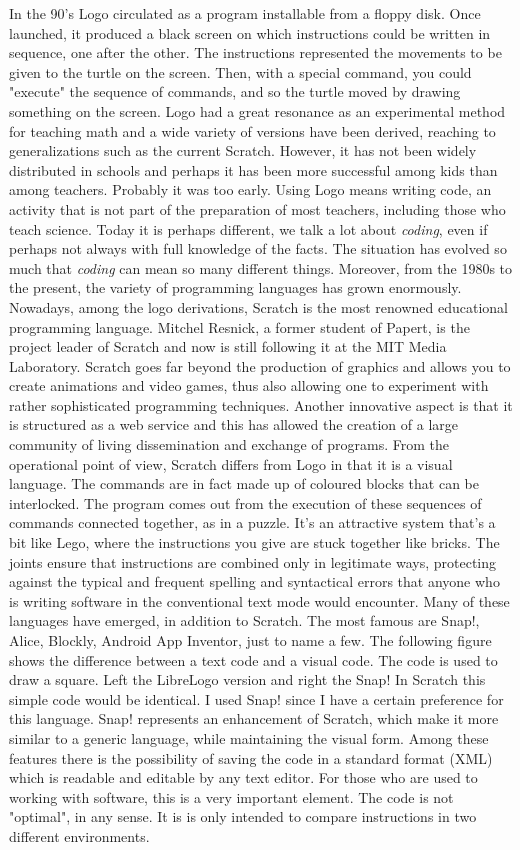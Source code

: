 In the 90's Logo circulated as a program installable from a floppy disk. Once launched, it produced a black screen on which instructions could be written in sequence, one after the other. The instructions represented the movements to be given to the turtle on the screen. Then, with a special command, you could "execute" the sequence of commands, and so the turtle moved by drawing something on the screen. Logo had a great resonance as an experimental method for teaching math and a wide variety of versions have been derived, reaching to generalizations such as the current Scratch. However, it has not been widely distributed in schools and perhaps it has been more successful among kids than among teachers. Probably it was too early. Using Logo means writing code, an activity that is not part of the preparation of most teachers, including those who teach science. Today it is perhaps different, we talk a lot about \textit{coding}, even if perhaps not always with full knowledge of the facts. The situation has evolved so much that \textit{coding} can mean so many different things. Moreover, from the 1980s to the present, the variety of programming languages has grown enormously. Nowadays, among the logo derivations, Scratch is the most renowned educational programming language. Mitchel Resnick, a former student of Papert, is the project leader of Scratch and now is still following it at the MIT Media Laboratory. Scratch goes far beyond the production of graphics and allows you to create animations and video games, thus also allowing one to experiment with rather sophisticated programming techniques. Another innovative aspect is that it is structured as a web service and this has allowed the creation of a large community of living dissemination and exchange of programs. From the operational point of view, Scratch differs from Logo in that it is a visual language. The commands are in fact made up of coloured blocks that can be interlocked. The program comes out from the execution of these sequences of commands connected together, as in a puzzle. It's an attractive system that's a bit like Lego, where the instructions you give are stuck together like bricks. The joints ensure that instructions are combined only in legitimate ways, protecting against the typical and frequent spelling and syntactical errors that anyone who is writing software in the conventional text mode would encounter. Many of these languages have emerged, in addition to Scratch. The most famous are Snap!, Alice, Blockly, Android App Inventor, just to name a few. The following figure shows the difference between a text code and a visual code. The code is used to draw a square. Left the LibreLogo version and right the Snap! In Scratch this simple code would be identical. I used Snap! since I have a certain preference for this language. Snap! represents an enhancement of Scratch, which make it more similar to a generic language, while maintaining the visual form. Among these features there is the possibility of saving  the code in a standard format (XML) which is readable and editable by any text editor. For those who are used to working with software, this is a very important element. The code is not "optimal", in any sense. It is  is only intended to compare instructions in two different environments. 

